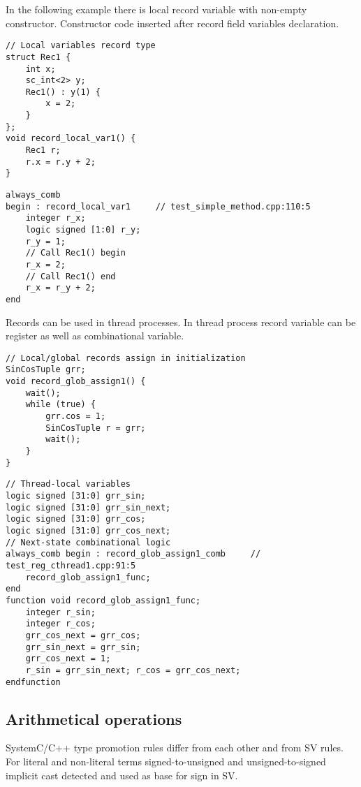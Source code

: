 In the following example there is local record variable with non-empty constructor. Constructor code inserted after record field variables declaration.
%
\begin{lstlisting}[style=mycpp]
// Local variables record type
struct Rec1 {
    int x;
    sc_int<2> y;       
    Rec1() : y(1) {
        x = 2;
    }
};
void record_local_var1() {
    Rec1 r;
    r.x = r.y + 2;
}
\end{lstlisting}
%
\begin{lstlisting}[style=myverilog]
always_comb 
begin : record_local_var1     // test_simple_method.cpp:110:5
    integer r_x;
    logic signed [1:0] r_y;
    r_y = 1;
    // Call Rec1() begin
    r_x = 2;
    // Call Rec1() end
    r_x = r_y + 2;
end
\end{lstlisting}

Records can be used in thread processes. In thread process record variable can be register as well as combinational variable. 

\begin{lstlisting}[style=mycpp]
// Local/global records assign in initialization
SinCosTuple grr;
void record_glob_assign1() {
    wait();
    while (true) {
        grr.cos = 1;
        SinCosTuple r = grr;
        wait();
    }
}
\end{lstlisting}
%
\begin{lstlisting}[style=myverilog]
// Thread-local variables
logic signed [31:0] grr_sin;
logic signed [31:0] grr_sin_next;
logic signed [31:0] grr_cos;
logic signed [31:0] grr_cos_next;
// Next-state combinational logic
always_comb begin : record_glob_assign1_comb     // test_reg_cthread1.cpp:91:5
    record_glob_assign1_func;
end
function void record_glob_assign1_func;
    integer r_sin;
    integer r_cos;
    grr_cos_next = grr_cos;
    grr_sin_next = grr_sin;
    grr_cos_next = 1;
    r_sin = grr_sin_next; r_cos = grr_cos_next;
endfunction
\end{lstlisting}




\subsection{Arithmetical operations}\label{section:arithmetic_gen}

SystemC/C++ type promotion rules differ from each other and from SV rules. For literal and non-literal terms signed-to-unsigned and unsigned-to-signed implicit cast detected and used as base for sign in SV.


